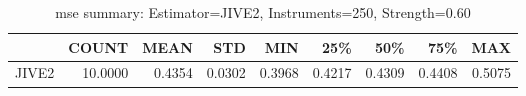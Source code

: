 \begin{table}[ht]
\centering
\caption{mse summary: Estimator=JIVE2, Instruments=250, Strength=0.60}
\begin{tabular}{lrrrrrrrr}
\toprule
 & COUNT & MEAN & STD & MIN & 25\% & 50\% & 75\% & MAX \\
\midrule
JIVE2 & 10.0000 & 0.4354 & 0.0302 & 0.3968 & 0.4217 & 0.4309 & 0.4408 & 0.5075 \\
\bottomrule
\end{tabular}
\end{table}
